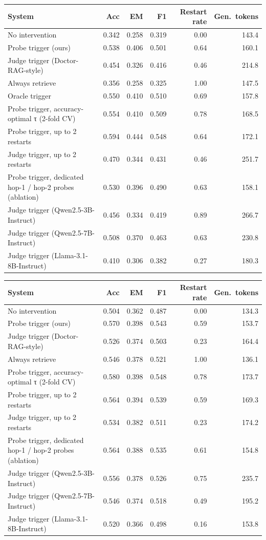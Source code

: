 \begin{tabular}{lrrrrr}
\toprule
System & Acc & EM & F1 & Restart rate & Gen.\ tokens \\
\midrule
No intervention & 0.342 & 0.258 & 0.319 & 0.00 & 143.4 \\
Probe trigger (ours) & 0.538 & 0.406 & 0.501 & 0.64 & 160.1 \\
Judge trigger (Doctor-RAG-style) & 0.454 & 0.326 & 0.416 & 0.46 & 214.8 \\
Always retrieve & 0.356 & 0.258 & 0.325 & 1.00 & 147.5 \\
Oracle trigger & 0.550 & 0.410 & 0.510 & 0.69 & 157.8 \\
Probe trigger, accuracy-optimal τ (2-fold CV) & 0.554 & 0.410 & 0.509 & 0.78 & 168.5 \\
Probe trigger, up to 2 restarts & 0.594 & 0.444 & 0.548 & 0.64 & 172.1 \\
Judge trigger, up to 2 restarts & 0.470 & 0.344 & 0.431 & 0.46 & 251.7 \\
Probe trigger, dedicated hop-1 / hop-2 probes (ablation) & 0.530 & 0.396 & 0.490 & 0.63 & 158.1 \\
Judge trigger (Qwen2.5-3B-Instruct) & 0.456 & 0.334 & 0.419 & 0.89 & 266.7 \\
Judge trigger (Qwen2.5-7B-Instruct) & 0.508 & 0.370 & 0.463 & 0.63 & 230.8 \\
Judge trigger (Llama-3.1-8B-Instruct) & 0.410 & 0.306 & 0.382 & 0.27 & 180.3 \\
\bottomrule
\end{tabular}

\begin{tabular}{lrrrrr}
\toprule
System & Acc & EM & F1 & Restart rate & Gen.\ tokens \\
\midrule
No intervention & 0.504 & 0.362 & 0.487 & 0.00 & 134.3 \\
Probe trigger (ours) & 0.570 & 0.398 & 0.543 & 0.59 & 153.7 \\
Judge trigger (Doctor-RAG-style) & 0.526 & 0.374 & 0.503 & 0.23 & 164.4 \\
Always retrieve & 0.546 & 0.378 & 0.521 & 1.00 & 136.1 \\
Probe trigger, accuracy-optimal τ (2-fold CV) & 0.580 & 0.398 & 0.548 & 0.78 & 173.7 \\
Probe trigger, up to 2 restarts & 0.564 & 0.394 & 0.539 & 0.59 & 169.3 \\
Judge trigger, up to 2 restarts & 0.534 & 0.382 & 0.511 & 0.23 & 174.2 \\
Probe trigger, dedicated hop-1 / hop-2 probes (ablation) & 0.564 & 0.388 & 0.535 & 0.61 & 154.8 \\
Judge trigger (Qwen2.5-3B-Instruct) & 0.556 & 0.378 & 0.526 & 0.75 & 235.7 \\
Judge trigger (Qwen2.5-7B-Instruct) & 0.546 & 0.374 & 0.518 & 0.49 & 195.2 \\
Judge trigger (Llama-3.1-8B-Instruct) & 0.520 & 0.366 & 0.498 & 0.16 & 153.8 \\
\bottomrule
\end{tabular}

